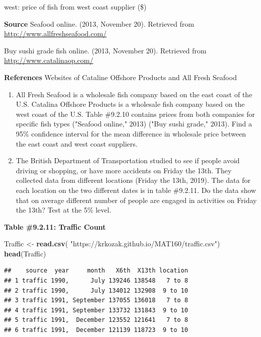\documentclass[
]{book}
\newenvironment{Shaded}{\begin{snugshade}}{\end{snugshade}}
\newcommand{\KeywordTok}[1]{\textcolor[rgb]{0.13,0.29,0.53}{\textbf{#1}}}
\newcommand{\NormalTok}[1]{#1}
\newcommand{\StringTok}[1]{\textcolor[rgb]{0.31,0.60,0.02}{#1}}
\begin{document}
west: price of fish from west coast supplier (\$)

\textbf{Source}
Seafood online. (2013, November 20). Retrieved from \url{http://www.allfreshseafood.com/}

Buy sushi grade fish online. (2013, November 20). Retrieved from \url{http://www.catalinaop.com/}

\textbf{References}
Websites of Cataline Offshore Products and All Fresh Seafood

\begin{enumerate}
\def\labelenumi{\arabic{enumi}.}
\setcounter{enumi}{3}
\item
  All Fresh Seafood is a wholesale fish company based on the east coast of the U.S. Catalina Offshore Products is a wholesale fish company based on the west coast of the U.S. Table \#9.2.10 contains prices from both companies for specific fish types ("Seafood online," 2013) ("Buy sushi grade," 2013). Find a 95\% confidence interval for the mean difference in wholesale price between the east coast and west coast suppliers.
\item
  The British Department of Transportation studied to see if people avoid driving or shopping, or have more accidents on Friday the 13th. They collected data from different locations (Friday the 13th, 2019). The data for each location on the two different dates is in table \#9.2.11. Do the data show that on average different number of people are engaged in activities on Friday the 13th? Test at the 5\% level.
\end{enumerate}

\textbf{Table \#9.2.11: Traffic Count}

\begin{Shaded}
\begin{Highlighting}[]
\NormalTok{Traffic <-}\StringTok{ }\KeywordTok{read.csv}\NormalTok{(}
  \StringTok{"https://krkozak.github.io/MAT160/traffic.csv"}\NormalTok{)}
\KeywordTok{head}\NormalTok{(Traffic)}
\end{Highlighting}
\end{Shaded}

\begin{verbatim}
##    source  year     month   X6th  X13th location
## 1 traffic 1990,      July 139246 138548   7 to 8
## 2 traffic 1990,      July 134012 132908  9 to 10
## 3 traffic 1991, September 137055 136018   7 to 8
## 4 traffic 1991, September 133732 131843  9 to 10
## 5 traffic 1991,  December 123552 121641   7 to 8
## 6 traffic 1991,  December 121139 118723  9 to 10
\end{verbatim}
\end{document}
